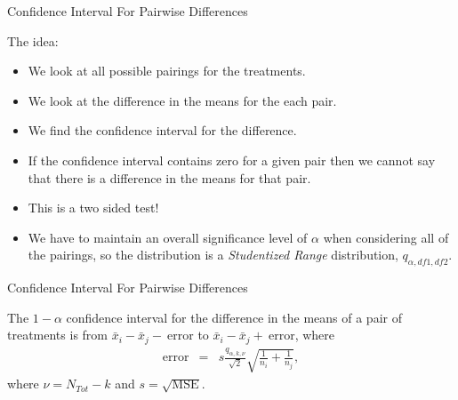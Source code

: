 \begin{frame}{Confidence Interval For Pairwise Differences}

  The idea:
  \begin{itemize}
  \item We look at all possible pairings for the treatments.
  \item We look at the difference in the means for the each pair.
  \item We find the confidence interval for the difference. 
  \item If the confidence interval contains zero for a given pair then
    we cannot say that there is a difference in the means for that
    pair.
  \item This is a two sided test!
  \item We have to maintain an overall significance level of $\alpha$
    when considering all of the pairings, so the distribution is a
    \textit{Studentized Range} distribution, $q_{\alpha,df1,df2}$.
  \end{itemize}

  \vfill
  
\end{frame}


\begin{frame}{Confidence Interval For Pairwise Differences}

  \begin{definition}
    The $1-\alpha$ confidence interval for the difference in the means of a pair
    of treatments is from $\bar{x}_i - \bar{x}_j - \mathrm{~error}$ to 
    $\bar{x}_i - \bar{x}_j + \mathrm{~error}$, where
    \begin{eqnarray*}
      \mathrm{error} & = & s \frac{q_{\alpha,k,\nu}}{\sqrt{2}} 
                           \sqrt{\frac{1}{n_i}+\frac{1}{n_j}},
    \end{eqnarray*}
    where $\nu=N_{Tot}-k$ and $s=\sqrt{\mathrm{MSE}}$.
  \end{definition}

\end{frame}

